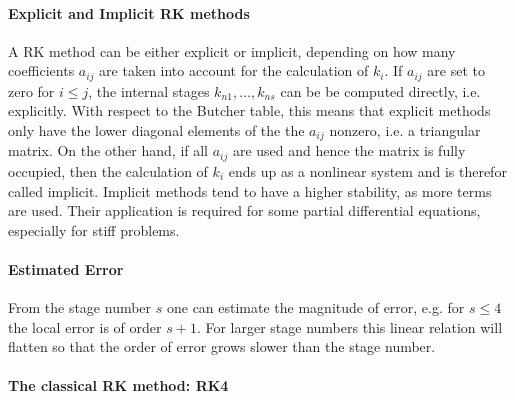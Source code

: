 \paragraph{Explicit and Implicit RK methods}
A RK method can be either explicit or implicit, depending on how many coefficients $a_{ij}$ are taken into account for the calculation of $k_i$.
If $a_{ij}$ are set to zero for $i \leq j$, the internal stages $k_{n1},..., k_{ns}$ can be be computed directly, i.e. explicitly.
With respect to the Butcher table, this means that explicit methods only have the lower diagonal elements of the the $a_{ij}$ nonzero, i.e. a triangular matrix.
On the other hand, if all $a_{ij}$ are used and hence the matrix is fully occupied,
then the calculation of $k_i$ ends up as a nonlinear system and is therefor called implicit. Implicit methods tend to have a higher stability, as more terms are used. Their application is required for some partial differential equations, especially for stiff problems. %


\paragraph{Estimated Error}
From the stage number $s$ one can estimate the magnitude of error, e.g. for $s \leq 4$ the local error is of order $s +1$.
For larger stage numbers this linear relation will flatten so that the order of error grows slower than the stage number.


\paragraph{The classical RK method: RK4}



